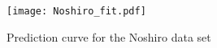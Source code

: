 \begin{figure}[h]
    \centering
        \centering
        \texttt{[image: Noshiro\_fit.pdf]}
        \caption{Prediction curve for the Noshiro data set}
        \label{fig:Nos}
    \end{figure}











